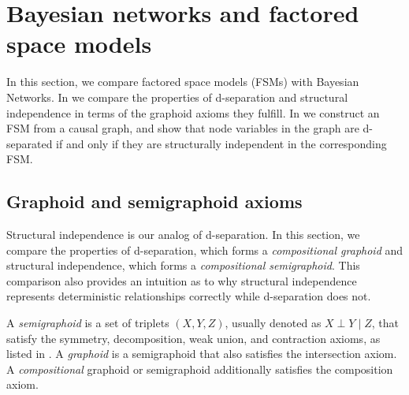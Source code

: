 \documentclass[USenglish,onecolumn]{article}
\begin{document}
\section{Bayesian networks and factored space models}
\label{sec:dag}

In this section, we compare factored space models (FSMs) with Bayesian Networks. In  we compare the properties of d-separation and structural independence in terms of the graphoid axioms they fulfill. In  we construct an FSM from a causal graph, and show that node variables in the graph are d-separated if and only if they are structurally independent in the corresponding FSM.

\subsection{Graphoid and semigraphoid axioms}
\label{sec:semigraphoid}

Structural independence is our analog of d-separation. In this section, we compare the properties of d-separation, which forms a \textit{compositional graphoid} and structural independence, which forms a \textit{compositional semigraphoid}. This comparison also provides an intuition as to why structural independence represents deterministic relationships correctly while d-separation does not.

\begin{definition}
A \emph{semigraphoid} is a set of triplets $(X,Y,Z)$, usually denoted as $X\perp Y\mid Z$, that satisfy the symmetry, decomposition, weak union, and contraction axioms, as listed in . A \emph{graphoid} \cite{pearl2022graphoids} is a semigraphoid that also satisfies the intersection axiom. A \emph{compositional} graphoid or semigraphoid additionally satisfies the composition axiom.
\end{definition}

\begin{table}[ht]
\resizebox{\textwidth}{!}{

}
\caption{\label{tab:semigraphoid}%
Comparison of \textbf{independence} in a probability distribution, \textbf{d-separation} in a directed acyclic graph (DAG), and \textbf{structural independence} on an FSM with regard to the graphoid and composition axioms. Independence satisfies 1.-4., which means it forms a \emph{semigraphoid} \cite{pearl1988probabilistic}, d-separation satisfies 1.-6., which means it forms a \emph{compositional graphoid}. Structural independence satisfies 1.-4. and 6., which means it forms a \emph{compositional semigraphoid}. Note that in terms of these axioms, structural independence is closer to independence than d-separation, as d-separation differs from independence for both the intersection and the composition axiom, while for structural independence the only difference is the composition axiom.}
\end{table}
\end{document}
